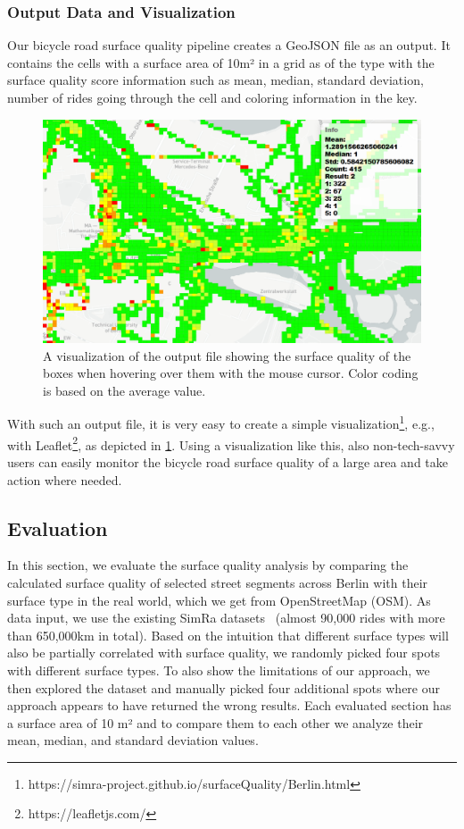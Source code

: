 \subsubsection{Output Data and Visualization}
\label{subsubsec:output_data_and_visualization}
Our bicycle road surface quality pipeline creates a GeoJSON file as an output.
It contains the cells with a surface area of 10m² in a grid as  of the  type  with the surface quality score information such as mean, median, standard deviation, number of rides going through the cell and coloring information in the  key.
 \begin{figure}
    \centering
    \includegraphics[width=\columnwidth]{fig/visualization.png}
    \caption{%
A visualization of the output file showing the surface quality of the boxes when hovering over them with the mouse cursor. Color coding is based on the average value.}%
    \label{fig:visualization}
\end{figure}
With such an output file, it is very easy to create a simple visualization\footnote{https://simra-project.github.io/surfaceQuality/Berlin.html}, e.g., with Leaflet\footnote{https://leafletjs.com/}, as depicted in \cref{fig:visualization}.
Using a visualization like this, also non-tech-savvy users can easily monitor the bicycle road surface quality of a large area and take action where needed.


\subsection{Evaluation}
\label{subsec:evaluation_cyclequality}
In this section, we evaluate the surface quality analysis by comparing the calculated surface quality of selected street segments across Berlin with their surface type in the real world, which we get from OpenStreetMap (OSM).
As data input, we use the existing SimRa datasets~\cite{dataset_simra_set1,dataset_simra_set2,dataset_simra_set3} (almost 90,000 rides with more than 650,000km in total).
Based on the intuition that different surface types will also be partially correlated with surface quality, we randomly picked four spots with different surface types.
To also show the limitations of our approach, we then explored the dataset and manually picked four additional spots where our approach appears to have returned the wrong results.
Each evaluated section has a surface area of 10 m² and to compare them to each other we analyze their mean, median, and standard deviation values.

